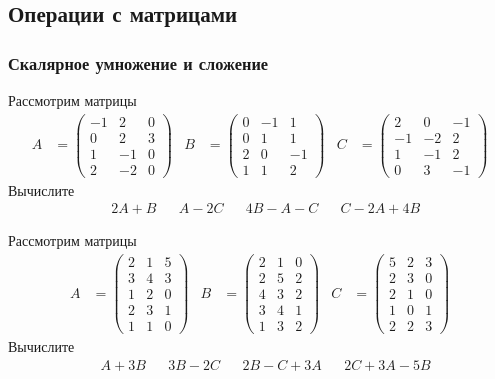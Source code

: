 
\subsection{Операции с матрицами}

\subsubsection{Скалярное умножение и сложение}

\begin{exercise}
Рассмотрим матрицы
\begin{align*}
	A&=\begin{pmatrix}
		-1 & 2 & 0 \\ 0 & 2 & 3 \\ 1 & -1 & 0 \\ 2 & -2 & 0
	\end{pmatrix} &
	B&=\begin{pmatrix}
		0 & -1 & 1 \\ 0 & 1 & 1 \\ 2 & 0 & -1 \\ 1 & 1 & 2
	\end{pmatrix} &
	C&=\begin{pmatrix}
		2 & 0 & -1 \\ -1 & -2 & 2 \\ 1 & -1& 2 \\ 0 & 3 & -1
	\end{pmatrix}
\end{align*}
Вычислите
\begin{align*}
	& 2A+B & &A-2C & &4B-A-C & &C-2A+4B
\end{align*}
\end{exercise}

\begin{exercise}
Рассмотрим матрицы
\begin{align*}
	A&=\begin{pmatrix}
		2 & 1 & 5 \\ 3 & 4 & 3 \\ 1 & 2 & 0 \\ 2 & 3 & 1 \\ 1 & 1 & 0
	\end{pmatrix} &
	B&=\begin{pmatrix}
		2 & 1 & 0 \\ 2 & 5 & 2 \\ 4 & 3 & 2 \\ 3 & 4 & 1 \\ 1 & 3 & 2
	\end{pmatrix} &
	C&=\begin{pmatrix}
		5 & 2 & 3 \\ 2 & 3 & 0 \\ 2 & 1 & 0 \\ 1 & 0 & 1 \\ 2 & 2 & 3
	\end{pmatrix}
\end{align*}
Вычислите
\begin{align*}
	& A+3B & &3B-2C & &2B-C+3A & &2C+3A-5B
\end{align*}
\end{exercise}

